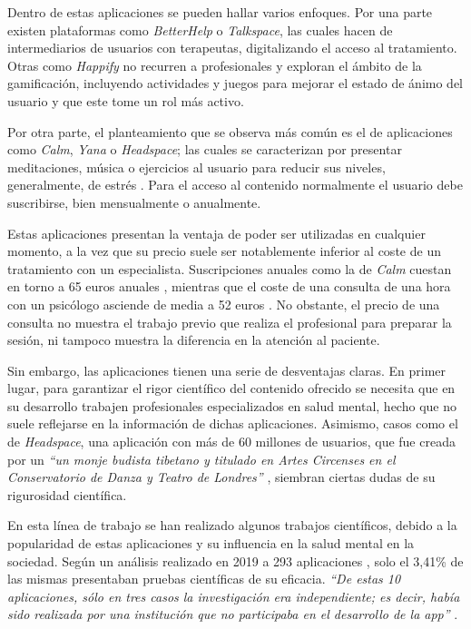         Dentro de estas aplicaciones se pueden hallar varios enfoques. Por una parte existen plataformas como \textit{BetterHelp} o \textit{Talkspace}, las cuales hacen de intermediarios de usuarios con terapeutas, digitalizando el acceso al tratamiento. Otras como \textit{Happify} no recurren a profesionales y exploran el ámbito de la gamificación, incluyendo actividades y juegos para mejorar el estado de ánimo del usuario y que este tome un rol más activo. 
        
        Por otra parte, el planteamiento que se observa más común es el de aplicaciones como \textit{Calm}, \textit{Yana} o \textit{Headspace}; las cuales se caracterizan por presentar meditaciones, música o ejercicios al usuario para reducir sus niveles, generalmente, de estrés \cite{modglin_5_2023} \cite{pepinosa_cinco_2023}. Para el acceso al contenido normalmente el usuario debe suscribirse, bien mensualmente o anualmente. 

        Estas aplicaciones presentan la ventaja de poder ser utilizadas en cualquier momento, a la vez que su precio suele ser notablemente inferior al coste de un tratamiento con un especialista. Suscripciones anuales como la de \textit{Calm} cuestan en torno a 65 euros anuales \cite{modglin_5_2023}, mientras que el coste de una consulta de una hora con un psicólogo asciende de media a 52 euros \cite{garcia_santos_boom_2023}. No obstante, el precio de una consulta no muestra el trabajo previo que realiza el profesional para preparar la sesión, ni tampoco muestra la diferencia en la atención al paciente.

        Sin embargo, las aplicaciones tienen una serie de desventajas claras. En primer lugar, para garantizar el rigor científico del contenido ofrecido se necesita que en su desarrollo trabajen profesionales especializados en salud mental, hecho que no suele reflejarse en la información de dichas aplicaciones. Asimismo, casos como el de \textit{Headspace}, una aplicación con más de 60 millones de usuarios, que fue creada por un \textit{``un monje budista tibetano y titulado en Artes Circenses en el Conservatorio de Danza y Teatro de Londres''} \cite{garcia_santos_boom_2023}, siembran ciertas dudas de su rigurosidad científica.
        
        En esta línea de trabajo se han realizado algunos trabajos científicos, debido a la popularidad de estas aplicaciones y su influencia en la salud mental en la sociedad. Según un análisis realizado en 2019 a 293 aplicaciones \cite{marshall_digital_2019}, solo el 3,41\% de las mismas presentaban pruebas científicas de su eficacia. \textit{``De estas 10 aplicaciones, sólo en tres casos la investigación era independiente; es decir, había sido realizada por una institución que no participaba en el desarrollo de la app''} \cite{garcia_santos_boom_2023}.

